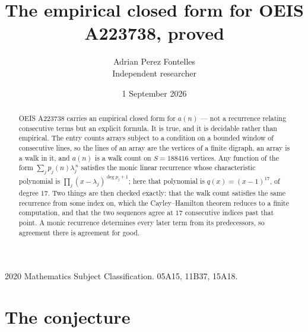 \documentclass[11pt,a4paper]{article}
\title{The empirical closed form for OEIS A223738, proved}
\author{Adrian Perez Fontelles\\ \small Independent researcher}
\date{1 September 2026}
\theoremstyle{plain}
\theoremstyle{definition}
\begin{document}
\maketitle

\begin{abstract}
OEIS A223738 carries an empirical closed form for $a(n)$ --- not a recurrence relating
consecutive terms but an explicit formula. It is true, and it is decidable rather than
empirical. The entry counts arrays subject to a condition on a bounded window of consecutive lines, so the lines of an array are the
vertices of a finite digraph, an array is a walk in it, and $a(n)$ is a walk count on
$S=188416$ vertices. Any function of the form $\sum_j p_j(n)\lambda_j^{\,n}$ satisfies the
monic linear recurrence whose characteristic polynomial is
$\prod_j(x-\lambda_j)^{\deg p_j+1}$; here that polynomial is $q(x)=(x-1)^{17}$, of degree
$17$. Two things are then checked exactly: that the walk count satisfies the same
recurrence from some index on, which the Cayley--Hamilton theorem reduces to a finite
computation, and that the two sequences agree at $17$ consecutive indices past that
point. A monic recurrence determines every later term from its predecessors, so agreement
there is agreement for good.
\end{abstract}

\noindent\small 2020 Mathematics Subject Classification. 05A15, 11B37, 15A18.\normalsize

\section{The conjecture}
\end{document}
